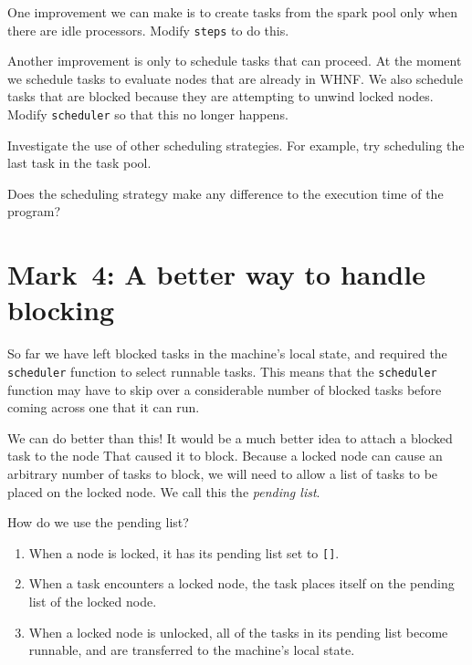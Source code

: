 \begin{exercise}\label{pgm:X:sched2}
One improvement we can make is to create tasks from the spark
pool only when there are idle processors. Modify \mbox{\tt steps} to do this.
\end{exercise}

\begin{exercise}\label{pgm:X:sched3}
Another improvement is only to schedule tasks that can proceed. At
the moment we schedule tasks to evaluate nodes that are already in
WHNF. We also schedule tasks that are blocked because they are
attempting to unwind locked nodes. Modify \mbox{\tt scheduler} so that this
no longer happens.
\end{exercise}

\begin{exercise}\label{pgm:X:scheduling}
Investigate the use of other scheduling strategies. For example, try
scheduling the last task in the task pool.

Does the scheduling strategy make any difference to the execution time
of the program?
\end{exercise}

\section{Mark~4: A better way to handle blocking}
\label{pgm:sc:mark4}

So far we have left blocked tasks in the
machine's local state, and required the \mbox{\tt scheduler} function to select
runnable tasks. This means that the \mbox{\tt scheduler} function may have to
skip over a considerable number of blocked tasks before coming across
one that it can run.

We can do better than this!
It would be a much better idea to attach a blocked task to the node
That caused it to block. Because a locked node can
cause an arbitrary number of tasks to block, we will need to allow a
list of tasks to be placed on the locked node. We call this the {\em
pending list}.

How do we use the pending list?
\begin{enumerate}
\item When a node is locked, it has its pending list set to \mbox{\tt []}.
\item When a task encounters a locked node, the task places
itself on the pending list of the locked node.
\item When a locked node is unlocked, all of the tasks in its pending
list become runnable, and are transferred to the machine's local state.
\end{enumerate}


